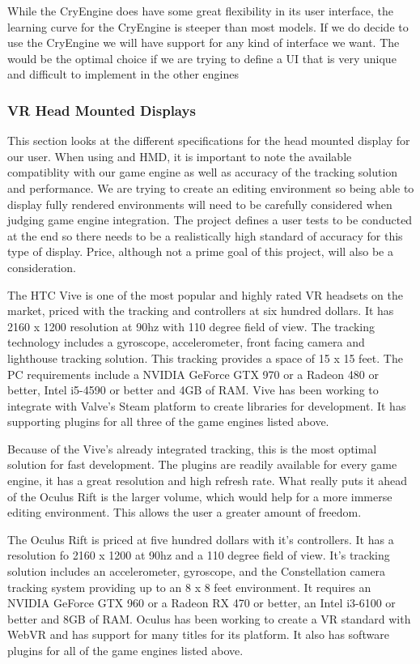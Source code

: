 \documentclass[onecolumn, draftclsnofoot,10pt, compsoc]{IEEEtran}
\newcounter{threesection}[subsubsection]
\begin{document}
While the CryEngine does have some great flexibility in its user interface, the learning curve for the CryEngine is steeper than most models. If we do decide to use the CryEngine we will have support for any kind of interface we want. The would be the optimal choice if we are trying to define a UI that is very unique and difficult to implement in the other engines

\subsubsection{VR Head Mounted Displays}
This section looks at the different specifications for the head mounted display for our user. When using and HMD, it is important to note the available compatiblity with our game engine as well as accuracy of the tracking solution and performance. We are trying to create an editing environment so being able to display fully rendered environments will need to be carefully considered when judging game engine integration. The project defines a user tests to be conducted at the end so there needs to be a realistically high standard of accuracy for this type of display. Price, although not a prime goal of this project, will also be a consideration.

The HTC Vive is one of the most popular and highly rated VR headsets on the market, priced with the tracking and controllers at six hundred dollars. It has 2160 x 1200 resolution at 90hz with 110 degree field of view. The tracking technology includes a gyroscope, accelerometer, front facing camera and lighthouse tracking solution. This tracking provides a space of 15 x 15 feet. The PC requirements include a NVIDIA GeForce GTX 970 or a Radeon 480 or better, Intel i5-4590 or better and 4GB of RAM. Vive has been working to integrate with Valve's Steam platform to create libraries for development. It has supporting plugins for all three of the game engines listed above.

Because of the Vive's already integrated tracking, this is the most optimal solution for fast development. The plugins are readily available for every game engine, it has a great resolution and high refresh rate. What really puts it ahead of the Oculus Rift is the larger volume, which would help for a more immerse editing environment. This allows the user a greater amount of freedom.   

The Oculus Rift is priced at five hundred dollars with it's controllers. It has a resolution fo 2160 x 1200 at 90hz and a 110 degree field of view. It's tracking solution includes an accelerometer, gyroscope, and the Constellation camera tracking system providing up to an 8 x 8 feet environment. It requires an NVIDIA GeForce GTX 960 or a Radeon RX 470 or better, an Intel i3-6100 or better and 8GB of RAM. Oculus has been working to create a VR standard with WebVR and has support for many titles for its platform. It also has software plugins for all of the game engines listed above.
\end{document}
